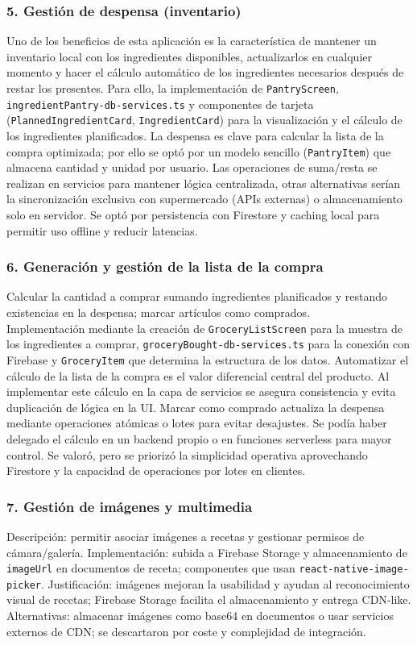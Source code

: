 \documentclass[twoside, openright, 11pt]{report}
\begin{document}
		\subsubsection{5. Gestión de despensa (inventario)}
			Uno de los beneficios de esta aplicación es la característica de mantener un inventario local con los ingredientes disponibles, actualizarlos en cualquier momento y hacer el cálculo automático de los ingredientes necesarios después de restar los presentes.
			Para ello, la implementación de \texttt{PantryScreen}, \texttt{ingredientPantry-db-services.ts} y componentes de tarjeta (\texttt{PlannedIngredientCard}, \texttt{IngredientCard}) para la visualización y el cálculo de los ingredientes planificados.  
			La despensa es clave para calcular la lista de la compra optimizada; por ello se optó por un modelo sencillo (\texttt{PantryItem}) que almacena cantidad y unidad por usuario. Las operaciones de suma/resta se realizan en servicios para mantener lógica centralizada, otras alternativas serían la sincronización exclusiva con supermercado (APIs externas) o almacenamiento solo en servidor. Se optó por persistencia con Firestore y caching local para permitir uso offline y reducir latencias.
		
		\subsubsection{6. Generación y gestión de la lista de la compra}
			Calcular la cantidad a comprar sumando ingredientes planificados y restando existencias en la despensa; marcar artículos como comprados.\\
			Implementación mediante la creación de \texttt{GroceryListScreen} para la muestra de los ingredientes a comprar, \texttt{groceryBought-db-services.ts} para la conexión con Firebase y \texttt{GroceryItem} que determina la estructura de los datos.
			Automatizar el cálculo de la lista de la compra es el valor diferencial central del producto. Al implementar este cálculo en la capa de servicios se asegura consistencia y evita duplicación de lógica en la UI. Marcar como comprado actualiza la despensa mediante operaciones atómicas o lotes para evitar desajustes.  
			Se podía haber delegado el cálculo en un backend propio o en funciones serverless para mayor control. Se valoró, pero se priorizó la simplicidad operativa aprovechando Firestore y la capacidad de operaciones por lotes en clientes.
		
		\subsubsection{7. Gestión de imágenes y multimedia}
			Descripción: permitir asociar imágenes a recetas y gestionar permisos de cámara/galería.  
			Implementación: subida a Firebase Storage y almacenamiento de \texttt{imageUrl} en documentos de receta; componentes que usan \texttt{react-native-image-picker}.  
			Justificación: imágenes mejoran la usabilidad y ayudan al reconocimiento visual de recetas; Firebase Storage facilita el almacenamiento y entrega CDN‑like.  
			Alternativas: almacenar imágenes como base64 en documentos o usar servicios externos de CDN; se descartaron por coste y complejidad de integración.
		
\end{document}
